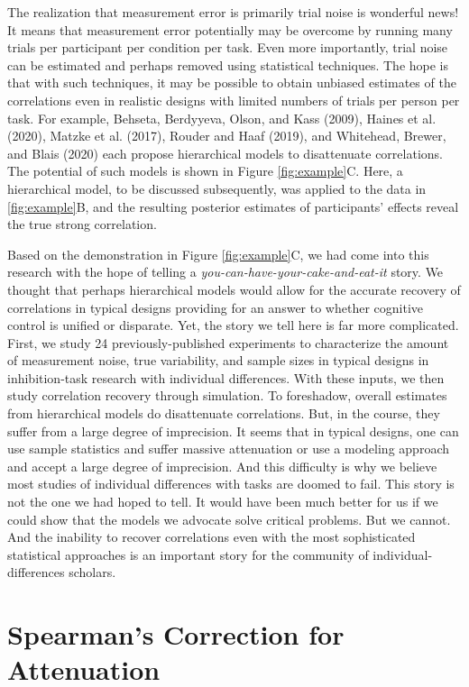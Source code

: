 \documentclass[
  english,
  ,man]{apa6}
\begin{document}
The realization that measurement error is primarily trial noise is wonderful news! It means that measurement error potentially may be overcome by running many trials per participant per condition per task. Even more importantly, trial noise can be estimated and perhaps removed using statistical techniques. The hope is that with such techniques, it may be possible to obtain unbiased estimates of the correlations even in realistic designs with limited numbers of trials per person per task. For example, Behseta, Berdyyeva, Olson, and Kass (2009), Haines et al. (2020), Matzke et al. (2017), Rouder and Haaf (2019), and Whitehead, Brewer, and Blais (2020) each propose hierarchical models to disattenuate correlations. The potential of such models is shown in Figure \ref{fig:example}C. Here, a hierarchical model, to be discussed subsequently, was applied to the data in \ref{fig:example}B, and the resulting posterior estimates of participants' effects reveal the true strong correlation.

Based on the demonstration in Figure \ref{fig:example}C, we had come into this research with the hope of telling a \emph{you-can-have-your-cake-and-eat-it} story. We thought that perhaps hierarchical models would allow for the accurate recovery of correlations in typical designs providing for an answer to whether cognitive control is unified or disparate. Yet, the story we tell here is far more complicated. First, we study 24 previously-published experiments to characterize the amount of measurement noise, true variability, and sample sizes in typical designs in inhibition-task research with individual differences. With these inputs, we then study correlation recovery through simulation. To foreshadow, overall estimates from hierarchical models do disattenuate correlations. But, in the course, they suffer from a large degree of imprecision. It seems that in typical designs, one can use sample statistics and suffer massive attenuation or use a modeling approach and accept a large degree of imprecision. And this difficulty is why we believe most studies of individual differences with tasks are doomed to fail. This story is not the one we had hoped to tell. It would have been much better for us if we could show that the models we advocate solve critical problems. But we cannot. And the inability to recover correlations even with the most sophisticated statistical approaches is an important story for the community of individual-differences scholars.

\hypertarget{spearmans-correction-for-attenuation}{%
\section{Spearman's Correction for Attenuation}\label{spearmans-correction-for-attenuation}}
\end{document}
